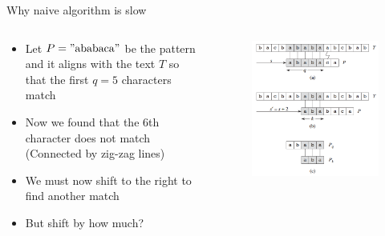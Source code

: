 \documentclass[10pt,xcolor={table,dvipsnames},t]{beamer}
\begin{document}
\begin{frame}{Why naive algorithm is slow}
  \begin{columns}
    \begin{column}{0.55\textwidth}
      \begin{itemize}
        \item Let $P="\text{ababaca}"$ be the pattern and it aligns with the text $T$ so that
        the first $q=5$ characters match
        \item Now we found that the $6$th character does not match (Connected by zig-zag lines)
        \item We must now shift to the right to find another match
        \item But shift by how much?
      \end{itemize}
    \end{column}
    \begin{column}{0.45\textwidth}
      \begin{figure}
        \includegraphics[width=\textwidth]{img/kmp-why-naive-slow.PNG}
      \end{figure}
    \end{column}
  \end{columns}
\end{frame}
\end{document}
